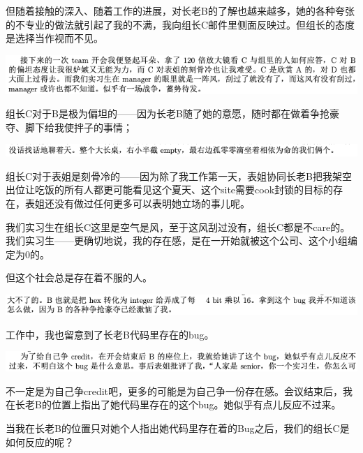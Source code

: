 \documentclass[9pt, b5paper]{article}
\begin{document}
但随着接触的深入、随着工作的进展，对长老B的了解也越来越多，她的各种夸张的不专业的做法就引起了我的不满，我向组长C邮件里侧面反映过。但组长的态度是选择当作视而不见。 

\begin{center}
\includegraphics[width=.9\linewidth]{./pic/backups_plans_20210504_231233.png}
\end{center}

组长C对于B是极为偏坦的——因为长老B随了她的意愿，随时都在做着争抢豪夺、脚下给我使拌子的事情；

\begin{center}
\includegraphics[width=.9\linewidth]{./pic/backups_plans_20210505_125854.png}
\end{center}

组长C对于表姐是刻骨冷的——因为除了我工作第一天，表姐协同长老B把我架空出位让吃饭的所有人都更可能看见这个夏天、这个site需要cook封锁的目标的存在，表姐还没有做过任何更多可以表明她立场的事儿呢。

我们实习生在组长C这里是空气是风，至于这风刮过没有，组长C都是不care的。我们实习生——更确切地说，我的存在感，是在一开始就被这个公司、这个小组编定为0的。

但这个社会总是存在着不服的人。 

\begin{center}
\includegraphics[width=.9\linewidth]{./pic/backups_plans_20210504_231258.png}
\end{center}

工作中，我也留意到了长老B代码里存在的bug。

\begin{center}
\includegraphics[width=.9\linewidth]{./pic/backups_plans_20210505_130526.png}
\end{center}

不一定是为自己争credit吧，更多的可能是为自己争一份存在感。会议结束后，我在长老B的位置上指出了她代码里存在的这个bug。她似乎有点儿反应不过来。 

当我在长老B的位置只对她个人指出她代码里存在着的Bug之后，我们的组长C是如何反应的呢？
\end{document}
